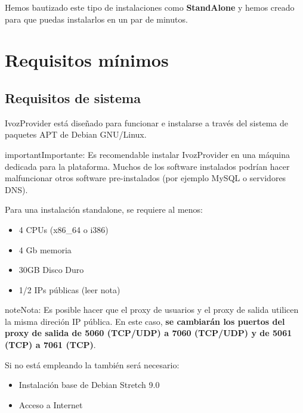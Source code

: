 \documentclass[letterpaper,10pt,spanish]{sphinxmanual}
\begin{document}
Hemos bautizado este tipo de instalaciones como \textbf{StandAlone} y hemos  creado {\hyperref[basic_concepts/installation/cd_install:automatic\string-iso\string-cd\string-image]{}} para que puedas instalarlos en un par de minutos.


\section{Requisitos mínimos}
\label{basic_concepts/installation/requirements:minimum-requirements}\label{basic_concepts/installation/requirements::doc}

\subsection{Requisitos de sistema}
\label{basic_concepts/installation/requirements:system-requirements}
IvozProvider está diseñado para funcionar e instalarse a través del sistema de paquetes APT de Debian GNU/Linux.

\begin{notice}{important}{Importante:}
Es recomendable instalar IvozProvider en una máquina dedicada para la plataforma. Muchos de los software instalados podrían hacer malfuncionar otros software pre-instalados (por ejemplo MySQL o servidores DNS).
\end{notice}

Para una instalación standalone, se requiere al menos:
\begin{itemize}
\item {} 
4 CPUs (x86\_64 o i386)

\item {} 
4 Gb memoria

\item {} 
30GB Disco Duro

\item {} 
1/2 IPs públicas (leer nota)

\end{itemize}

\begin{notice}{note}{Nota:}
Es posible hacer que el proxy de usuarios y el proxy de salida utilicen la misma direción IP pública. En este caso, \textbf{se cambiarán los puertos del proxy de salida de 5060 (TCP/UDP) a 7060 (TCP/UDP) y de 5061 (TCP) a 7061 (TCP)}.
\end{notice}

Si no está empleando la {\hyperref[basic_concepts/installation/cd_install:automatic\string-iso\string-cd\string-image]{}} también será necesario:
\begin{itemize}
\item {} 
Instalación base de Debian Stretch 9.0

\item {} 
Acceso a Internet

\end{itemize}
\end{document}
